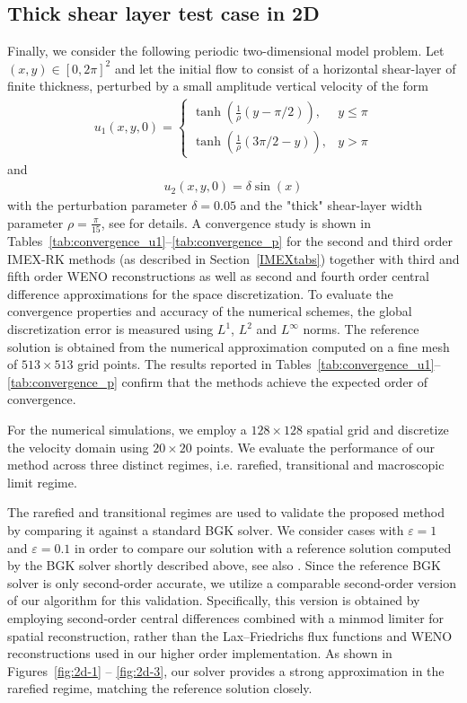 \documentclass[final,11pt]{siamart251216}
\numberwithin{equation}{section}
\theoremstyle{definition}
\theoremstyle{remark}
\begin{document}
\subsection{Thick shear layer test case in 2D}
Finally, we consider the following periodic two-dimensional model problem. Let $(x,y) \in \left[ 0,2 \pi\right]^2$ and let the initial flow to consist of a horizontal shear-layer of finite thickness, perturbed by a small amplitude vertical velocity of the form 
\begin{align}\label{InitialVelocity}
	u_1(x,y,0) = \begin{cases}\tanh(\frac{1}{\rho}(y-\pi/2)), & y \leq \pi \\ \tanh(\frac{1}{\rho}(3\pi/2 - y)), & y> \pi \end{cases}
\end{align}
and
\begin{align}
	u_2(x,y,0) = \delta \sin(x)
\end{align}
with the perturbation parameter $\delta = 0.05$ and the "thick" shear-layer width parameter $\rho = \frac{\pi}{15}$, see \cite{Bell} for details. 
A convergence study is shown in Tables~\eqref{tab:convergence_u1}--\eqref{tab:convergence_p} for the second and third order IMEX-RK methods (as described in Section~\ref{IMEXtabs}) together with third and fifth order WENO reconstructions as well as second and fourth order central difference approximations for the space discretization. 
To evaluate the convergence properties and accuracy of the numerical schemes, the global discretization error is measured using $L^1$, $L^2$ and $L^\infty$ norms. The reference solution is obtained from the numerical approximation computed on a fine mesh of $513 \times 513$ grid points. The results reported in Tables~\eqref{tab:convergence_u1}--\eqref{tab:convergence_p} confirm that the methods achieve the expected order of convergence.

For the numerical simulations, we employ a $128 \times 128$ spatial grid and discretize the velocity domain using $20 \times 20$ points.
We evaluate the performance of our method across three distinct regimes, i.e. rarefied, transitional and macroscopic limit regime. 

The rarefied and transitional regimes are used to validate the proposed method by comparing it against a standard BGK solver.
We consider cases with $\varepsilon = 1$ and $\varepsilon = 0.1$ in order to compare our solution with a reference solution computed by the BGK solver shortly described above, see also \cite{TKR}. Since the reference BGK solver is only second-order accurate, we utilize a comparable second-order version of our algorithm for this validation. Specifically, this version is obtained by employing second-order central differences combined with a minmod limiter for spatial reconstruction, rather than the Lax--Friedrichs flux functions and WENO reconstructions used in our higher order implementation.
As shown in Figures~\eqref{fig:2d-1} -- \eqref{fig:2d-3}, our solver provides a strong approximation in the rarefied  regime, matching the reference solution closely.
\end{document}
